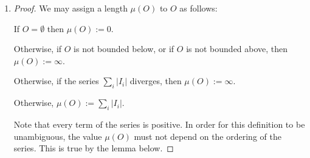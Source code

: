 \begin{enumerate}[label=(1.\arabic*)]
\begin{proof}
    Note that either one of the elements of $I$ has no lower bound, or none do.

    Let $I \in \mc I$.

    We now show that the elements of $\mc I$ are open sets. Let $I \in \mc I$ and suppose for a contradiction
    that $I$ is not open. Then there exists $x \in I$ such that no neighborhood of $x$ is contained within $I$.
    Let $x$ be such a point and let $N(x)$ be a neighborhood of $x$. We claim
    that $N(x) \cap (\R \setminus O) \neq \emptyset$, i.e. that $N(x)$ contains a point outside $O$. [Incomplete]

    We now show that this is a countable union.

    Note that every rational number is in zero or one interval, but not more than one. Furthermore, every
    interval contains at least one rational.

    Therefore there is a non-injective surjection from a subset of the rationals to the set of intervals.

    Therefore the cardinality of the set of intervals is not greater than the cardinality of the rationals.

    Therefore the set of intervals is countable.
  \end{proof}

\item
  \begin{proof}
    We may assign a length $\mu(O)$ to $O$ as follows:

    If $O = \emptyset$ then $\mu(O) := 0$.

    Otherwise, if $O$ is not bounded below, or if $O$ is not bounded above, then $\mu(O) := \infty$.

    Otherwise, if the series $\sum_i |I_i|$ diverges, then $\mu(O) := \infty$.

    Otherwise, $\mu(O) := \sum_i |I_i|$.

    Note that every term of the series is positive. In order for this definition to be unambiguous, the
    value $\mu(O)$ must not depend on the ordering of the series. This is true by the lemma below.
  \end{proof}


\end{enumerate}
